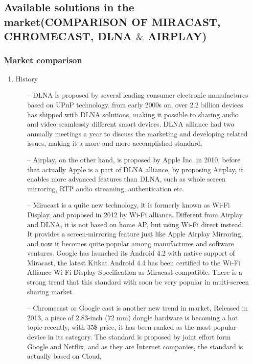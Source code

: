 \subsection*{Available solutions in the market(COMPARISON OF MIRACAST, CHROMECAST, DLNA $\&$ AIRPLAY)}

\subsubsection*{Market comparison}

\begin{enumerate}
\item History
\begin{itemize}
\item[--]DLNA is proposed by several leading consumer electronic manufactures based on UPnP 
technology, from early 2000s on, over 2.2 billion devices has shipped with DLNA solutions, 
making it possible to sharing audio and video seamlessly different smart devices. DLNA alliance 
had two annually meetings a year to discuss the marketing and developing related issues, making 
it a more and more accomplished standard.
\item[--]Airplay, on the other hand, is proposed by Apple Inc. in 2010, before that actually 
Apple is a part of DLNA alliance, by proposing Airplay, it enables more advanced features than 
DLNA, such as whole screen mirroring, RTP audio streaming, authentication etc.
\item[--]Miracast is a quite new technology, it is formerly known as Wi-Fi Display, and proposed 
in 2012 by Wi-Fi alliance. Different from Airplay and DLNA, it is not based on home AP, but using 
Wi-Fi direct instead. It provides a screen-mirroring feature just like Apple Airplay Mirroring, 
and now it becomes quite popular among manufactures and software ventures. Google has launched 
its Android 4.2 with native support of Miracast, the latest Kitkat Android 4.4 has been certified 
to the Wi-Fi Alliance Wi-Fi Display Specification as Miracast compatible. There is a strong trend 
that this standard with soon be very popular in multi-screen sharing market.
\item[--]Chromecast or Google cast is another new trend in market, Released in 2013, a piece of 
2.83-inch (72 mm) dongle hardware is becoming a hot topic recently, with 35\$ price, it has been 
ranked as the most popular device in its category. The standard is proposed by joint effort form 
Google and Netflix, and as they are Internet companies, the standard is actually based on Cloud, 

\end{itemize}
\end{enumerate}
